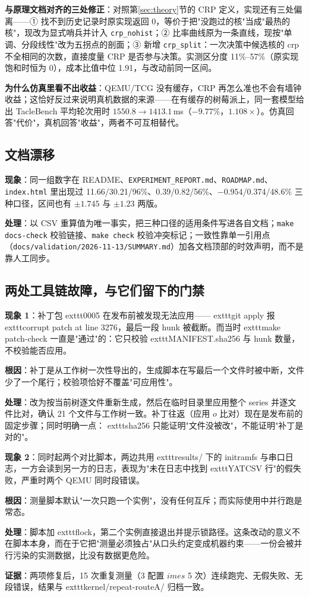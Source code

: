 \textbf{与原理文档对齐的三处修正}：对照第\ref{sec:theory}节的 CRP 定义，实现还有三处偏离——① 找不到历史记录时原实现返回 0，等价于把"没跑过的核"当成"最热的核"，现改为显式哨兵并计入 \texttt{crp\_nohist}；② 比率曲线原为一条直线，现按"单调、分段线性"改为五拐点的剖面；③ 新增 \texttt{crp\_split}：一次决策中候选核的 crp 不全相同的次数，直接度量 CRP 是否参与决策。实测区分度 11\%--57\%（原实现饱和时恒为 0），成本比值中位 1.91，与改动前同一区间。

\textbf{为什么仿真里看不出收益}：QEMU/TCG 没有缓存，CRP 再怎么准也不会有墙钟收益；这恰好反过来说明真机数据的来源——在有缓存的树莓派上，同一套模型给出 TacleBench 平均轮次用时 $1550.8\to1413.1$\,ms（$-9.77\%$，$1.108\times$）。仿真回答"代价"，真机回答"收益"，两者不可互相替代。

\subsection{文档漂移}

\textbf{现象}：同一组数字在 README、\texttt{EXPERIMENT\_REPORT.md}、\texttt{ROADMAP.md}、\texttt{index.html} 里出现过 11.66/30.21/96\%、0.39/0.82/56\%、$-0.954$/0.374/48.6\% 三种口径，区间也有 $\pm1.745$ 与 $\pm1.23$ 两版。

\textbf{处理}：以 CSV 重算值为唯一事实，把三种口径的适用条件写进各自文档；\texttt{make docs-check} 校验链接、\texttt{make check} 校验冲突标记；一致性靠单一引用点（\texttt{docs/validation/2026-11-13/SUMMARY.md}）加各文档顶部的时效声明，而不是靠人工同步。

\subsection{两处工具链故障，与它们留下的门禁}

\textbf{现象 1}：补丁包 	exttt{0005} 在发布前被发现无法应用——	exttt{git apply} 报 	exttt{corrupt patch at line 3276}，最后一段 hunk 被截断。而当时 	exttt{make patch-check} 一直是"通过"的：它只校验 	exttt{MANIFEST.sha256} 与 hunk 数量，不校验能否应用。

\textbf{根因}：补丁是从工作树一次性导出的，生成脚本在写最后一个文件时被中断，文件少了一个尾行；校验项恰好不覆盖"可应用性"。

\textbf{处理}：改为按当前树逐文件重新生成，然后在临时目录里应用整个 series 并逐文件比对，确认 21 个文件与工作树一致。补丁往返（应用 $	o$ 比对）现在是发布前的固定步骤；同时明确一点：	exttt{sha256} 只能证明"文件没被改"，不能证明"补丁是对的"。

\textbf{现象 2}：同时起两个对比脚本，两边共用 	exttt{results/} 下的 initramfs 与串口日志，一方会读到另一方的日志，表现为"未在日志中找到 	exttt{YATCSV} 行"的假失败，严重时两个 QEMU 同时段错误。

\textbf{根因}：测量脚本默认"一次只跑一个实例"，没有任何互斥；而实际使用中并行跑是常态。

\textbf{处理}：脚本加 	exttt{flock}，第二个实例直接退出并提示锁路径。这条改动的意义不在脚本本身，而在于它把"测量必须独占"从口头约定变成机器约束——一份会被并行污染的实测数据，比没有数据更危险。

\textbf{证据}：两项修复后，15 次重复测量（3 配置 $	imes$ 5 次）连续跑完、无假失败、无段错误，结果与 	exttt{kernel/repeat-routeA/} 归档一致。
